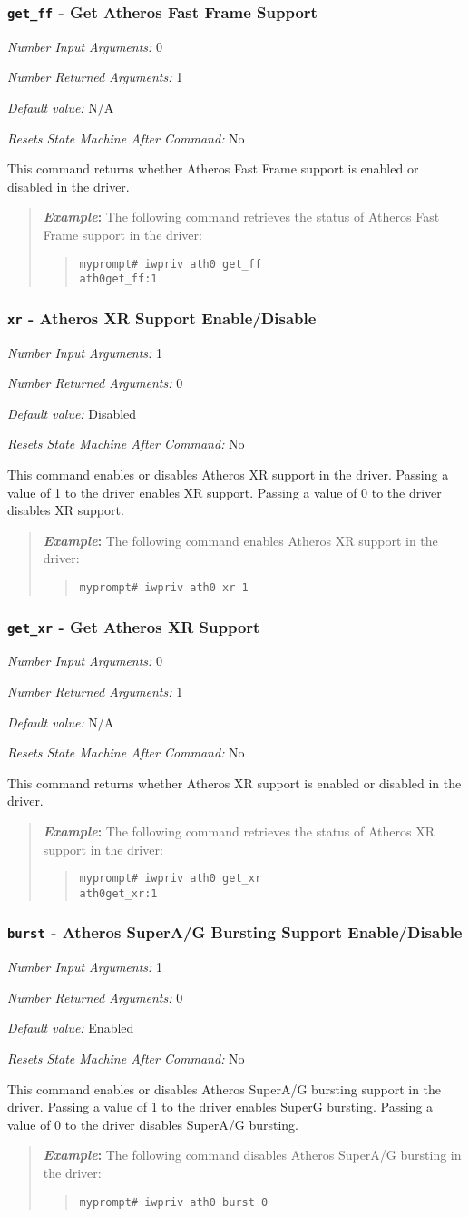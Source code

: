 \documentclass[10pt,fullpage]{article}
\newcommand{\mytt}[1]{{\texttt{#1}}}
\newcommand{\bv}{\begin{verse}}
\newcommand{\ev}{\end{verse}}
\newcommand{\cmd}[1]{{\texttt{myprompt\# #1}}}
\newcommand{\argdesc}[4]{\begin{description}
\itemsep -6pt
\item \textit{Number Input Arguments:} #1
\item \textit{Number Returned Arguments:} #2
\item \textit{Default value:} #3
\item \textit{Resets State Machine After Command:} #4
\end{description}
}
\newenvironment{example}{\begin{quote}\textbf{\textit{Example}:}}{\end{quote}}
\begin{document}
\subsubsection{\mytt{get\_ff} - Get Atheros Fast Frame Support}
\argdesc{0}{1}{N/A}{No}
This command returns whether Atheros Fast Frame support is enabled or
disabled in the driver.
\begin{example}
The following command retrieves the status of Atheros Fast Frame
support in the driver:
\bv
\cmd{iwpriv ath0 get\_ff}\\
\mytt{ath0\hspace{32pt}get\_ff:1}
\ev
\end{example}

\subsubsection{\mytt{xr} - Atheros XR Support Enable/Disable}
\argdesc{1}{0}{Disabled}{No}
This command enables or disables Atheros XR support in the driver.
Passing a value of 1 to the driver enables XR support. Passing a value
of 0 to the driver disables XR support.
\begin{example}
The following command enables Atheros XR support in the driver:
\bv
\cmd{iwpriv ath0 xr 1}
\ev
\end{example}

\subsubsection{\mytt{get\_xr} - Get Atheros XR Support}
\argdesc{0}{1}{N/A}{No}
This command returns whether Atheros XR support is enabled or disabled
in the driver.
\begin{example}
The following command retrieves the status of Atheros XR support in
the driver:
\bv
\cmd{iwpriv ath0 get\_xr}\\
\mytt{ath0\hspace{32pt}get\_xr:1}
\ev
\end{example}

\subsubsection{\mytt{burst} - Atheros SuperA/G Bursting Support
  Enable/Disable}
\argdesc{1}{0}{Enabled}{No}
This command enables or disables Atheros SuperA/G bursting support in the driver.
Passing a value of 1 to the driver enables SuperG bursting. Passing a value
of 0 to the driver disables SuperA/G bursting.
\begin{example}
The following command disables Atheros SuperA/G bursting in the driver:
\bv
\cmd{iwpriv ath0 burst 0}
\ev
\end{example}
\end{document}
